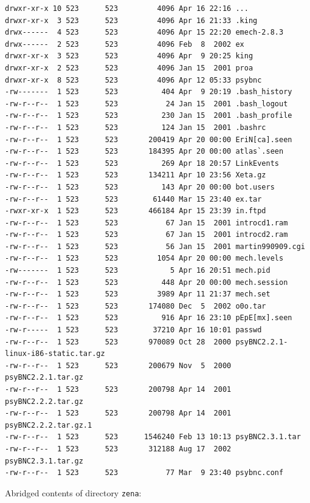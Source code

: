 \begin{lstlisting}[style=terminal]
drwxr-xr-x 10 523      523         4096 Apr 16 22:16 ...
drwxr-xr-x  3 523      523         4096 Apr 16 21:33 .king
drwx------  4 523      523         4096 Apr 15 22:20 emech-2.8.3
drwx------  2 523      523         4096 Feb  8  2002 ex
drwxr-xr-x  3 523      523         4096 Apr  9 20:25 king
drwxr-xr-x  2 523      523         4096 Jan 15  2001 proa
drwxr-xr-x  8 523      523         4096 Apr 12 05:33 psybnc
-rw-------  1 523      523          404 Apr  9 20:19 .bash_history
-rw-r--r--  1 523      523           24 Jan 15  2001 .bash_logout
-rw-r--r--  1 523      523          230 Jan 15  2001 .bash_profile
-rw-r--r--  1 523      523          124 Jan 15  2001 .bashrc
-rw-r--r--  1 523      523       200419 Apr 20 00:00 EriN[ca].seen
-rw-r--r--  1 523      523       184395 Apr 20 00:00 atlas`.seen
-rw-r--r--  1 523      523          269 Apr 18 20:57 LinkEvents
-rw-r--r--  1 523      523       134211 Apr 10 23:56 Xeta.gz
-rw-r--r--  1 523      523          143 Apr 20 00:00 bot.users
-rw-r--r--  1 523      523        61440 Mar 15 23:40 ex.tar
-rwxr-xr-x  1 523      523       466184 Apr 15 23:39 in.ftpd
-rw-r--r--  1 523      523           67 Jan 15  2001 introcd1.ram
-rw-r--r--  1 523      523           67 Jan 15  2001 introcd2.ram
-rw-r--r--  1 523      523           56 Jan 15  2001 martin990909.cgi
-rw-r--r--  1 523      523         1054 Apr 20 00:00 mech.levels
-rw-------  1 523      523            5 Apr 16 20:51 mech.pid
-rw-r--r--  1 523      523          448 Apr 20 00:00 mech.session
-rw-r--r--  1 523      523         3989 Apr 11 21:37 mech.set
-rw-r--r--  1 523      523       174080 Dec  5  2002 o0o.tar
-rw-r--r--  1 523      523          916 Apr 16 23:10 pEpE[mx].seen
-rw-r-----  1 523      523        37210 Apr 16 10:01 passwd
-rw-r--r--  1 523      523       970089 Oct 28  2000 psyBNC2.2.1-linux-i86-static.tar.gz
-rw-r--r--  1 523      523       200679 Nov  5  2000 psyBNC2.2.1.tar.gz
-rw-r--r--  1 523      523       200798 Apr 14  2001 psyBNC2.2.2.tar.gz
-rw-r--r--  1 523      523       200798 Apr 14  2001 psyBNC2.2.2.tar.gz.1
-rw-r--r--  1 523      523      1546240 Feb 13 10:13 psyBNC2.3.1.tar
-rw-r--r--  1 523      523       312188 Aug 17  2002 psyBNC2.3.1.tar.gz
-rw-r--r--  1 523      523           77 Mar  9 23:40 psybnc.conf 
\end{lstlisting}

\vspace{1em} 

Abridged contents of directory \texttt{zena}:
 
